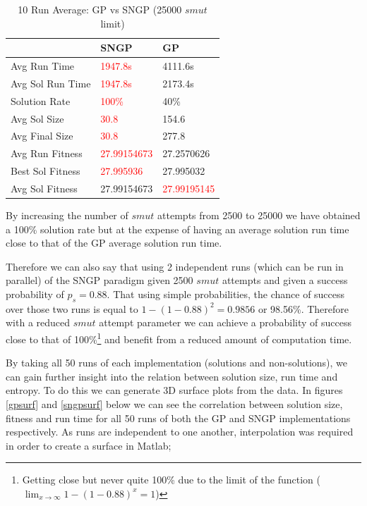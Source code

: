 \documentclass[a4paper,10.5pt]{article}
\begin{document}
\begin{table}[H]
\caption{10 Run Average: GP vs SNGP (25000 $smut$ limit)}
\centering
    \begin{tabular}{l|l|l}
    ~                 & SNGP           & GP             \\ \hline
    Avg Run Time      &    \textcolor{red}{1947.8s} &    4111.6s \\
    Avg Sol Run Time  & \textcolor{red}{1947.8s}    & 2173.4s   \\
    Solution Rate     & \textcolor{red}{100\%}           & 40\%           \\
    Avg Sol Size & \textcolor{red}{30.8} & 154.6          \\
    Avg Final Size  & \textcolor{red}{30.8}        & 277.8          \\
    Avg Run Fitness   & \textcolor{red}{ 27.99154673}    &  27.2570626    \\
    Best Sol Fitness  & \textcolor{red}{27.995936}      & 27.995032      \\
    Avg Sol Fitness   & 27.99154673    & \textcolor{red}{27.99195145}    \\
    \end{tabular}
\label{25000}
\end{table}

By increasing the number of $smut$ attempts from 2500 to 25000 we have obtained a 100\% solution rate but at the expense of having an average solution run time close to that of the GP average solution run time.

Therefore we can also say that using 2 independent runs (which can be run in parallel) of the SNGP paradigm given 2500 $smut$ attempts and given a success probability of $p_s = 0.88$. That using simple probabilities, the chance of success over those two runs is equal to $1 - (1 - 0.88)^{2} = 0.9856$ or 98.56\%.  Therefore with a reduced $smut$ attempt parameter we can achieve a probability of success close to that of 100\%\footnote{Getting close but never quite 100\% due to the limit of the function ($\lim_{x \to \infty} 1 - (1 - 0.88)^{x} = 1$)} and benefit from a reduced amount of computation time.

By taking all 50 runs of each implementation (solutions and non-solutions), we can gain further insight into the relation between solution size, run time and entropy. To do this we can generate 3D surface plots from the data. In figures \ref{gpsurf} and \ref{sngpsurf} below we can see the correlation between solution size, fitness and run time for all 50 runs of both the GP and SNGP implementations respectively. As runs are independent to one another, interpolation was required in order to create a surface in Matlab;
\end{document}
